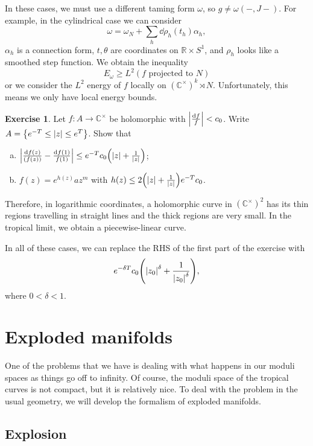 \documentclass[leqno, openany]{memoir}
\theoremstyle{definition}
\newtheorem{exer}[thm]{Exercise}
\theoremstyle{remark}
\theoremstyle{plain}
\theoremstyle{definition}
\theoremstyle{remark}
\newcommand{\R}{\mathbb{R}}
\newcommand{\C}{\mathbb{C}}
\begin{document}
In these cases, we must use a different taming form $\omega$, so $g \neq \omega(-, J-)$. For example, in the cylindrical case we can consider
\[ \omega = \omega_N + \sum_h \dd{\rho_h(t_h)} \alpha_h, \]
$\alpha_h$ is a connection form, $t, \theta$ are coordinates on $\R \times S^1$, and $\rho_h$ looks like a smoothed step function. We obtain the inequality
\[ E_{\omega} \geq L^2(\text{$f$ projected to $N$}) \]
or we consider the $L^2$ energy of $f$ locally on $(\C^{\times})^k \rtimes N$. Unfortunately, this means we only have local energy bounds.

\begin{exer}
    Let $f \colon A \to \C^{\times}$ be holomorphic with $\abs{\frac{\dd{f}}{f}} < c_0$. Write $A = \qty{e^{-T} \leq \abs{z} \leq e^T}$. Show that
    \begin{enumerate}[(a)]
        \item $\abs{\frac{\dd{f(z)}}{(f(z))} - \frac{\dd{f(1)}}{f(1)}} \leq e^{-T} c_0\qty(\abs{z} + \frac{1}{\abs{z}})$;
        \item $f(z) = e^{h(z)} a z^m$ with $h(z) \leq 2 \qty(\abs{z} + \frac{1}{\abs{z}}) e^{-T} c_0$.
    \end{enumerate}
\end{exer}

Therefore, in logarithmic coordinates, a holomorphic curve in $(\C^{\times})^2$ has its thin regions travelling in straight lines and the thick regions are very small. In the tropical limit, we obtain a piecewise-linear curve.

In all of these cases, we can replace the RHS of the first part of the exercise with
\[ e^{-\delta T} c_0 \qty(\abs{z_0}^{\delta} + \frac{1}{\abs{z_0}^{\delta}}), \]
where $0 < \delta < 1$.

\section{Exploded manifolds}
\label{sec:exploded}

One of the problems that we have is dealing with what happens in our moduli spaces as things go off to infinity. Of course, the moduli space of the tropical curves is not compact, but it is relatively nice. To deal with the problem in the usual geometry, we will develop the formalism of exploded manifolds.

\subsection{Explosion}
\label{subsec:explosion}
\end{document}
